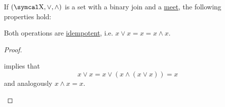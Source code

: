 \begin{proposition}\label{thm:binary_lattice_operations_properties}
  If \( (\CX, \vee, \wedge) \) is a set with a binary join and a \hyperref[def:binary_lattice_operations]{meet}, the following properties hold:
  \begin{defenum}
     Both operations are \hyperref[def:algebraic_theory/idempotent_element]{idempotent}, i.e. \( x \vee x = x = x \wedge x \).
  \end{defenum}
\end{proposition}
\begin{proof}\mbox{}
  \begin{description}
      implies that
    \begin{equation*}
      x \vee x = x \vee (x \wedge (x \vee x)) = x
    \end{equation*}
    and analogously \( x \wedge x = x \).
  \end{description}
\end{proof}

